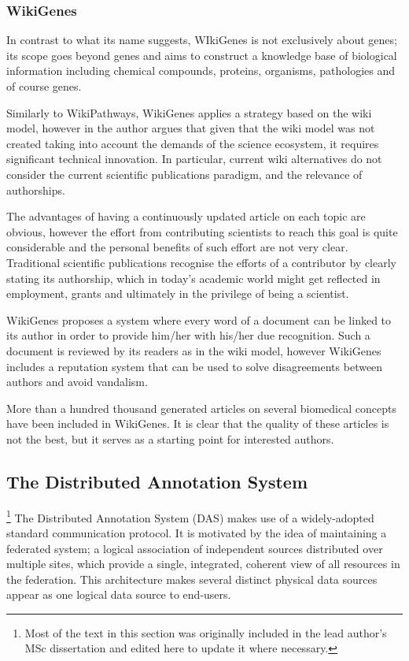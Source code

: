 \subsubsection{WikiGenes}
In contrast to what its name suggests, WIkiGenes is not exclusively about genes; its scope goes beyond genes and aims to construct a knowledge base of biological information including chemical compounds, proteins, organisms, pathologies and of course genes. 

Similarly to WikiPathways, WikiGenes applies a strategy based on the wiki model, however in \cite{HOF2008} the author argues that given that the wiki model was not created taking into account the demands of the science ecosystem, it requires significant technical innovation. In particular, current wiki alternatives do not consider the current scientific publications paradigm, and the relevance of authorships. 

The advantages of having a continuously updated article on each topic are obvious, however the effort from contributing scientists to reach this goal is quite considerable and the personal benefits of such effort are not very clear. Traditional scientific publications recognise the efforts of a contributor by clearly stating its authorship, which in today's academic world might get reflected in employment, grants and ultimately in the privilege of being a scientist.

WikiGenes proposes a system where every word of a document can be linked to its author in order to provide him/her with his/her due recognition. Such a document is reviewed by its readers as in the wiki model, however WikiGenes includes a reputation system that can be used to solve disagreements between authors and avoid vandalism.

More than a hundred thousand generated articles on several biomedical concepts have been included in WikiGenes. It is clear that the quality of these articles is not the best, but it serves as a starting point for interested authors.


\subsection{The Distributed Annotation System}
\footnote{Most of the text in this section was originally included in the lead author's MSc dissertation\cite{SAL2010} and edited here to update it where necessary.}
The Distributed Annotation System (DAS) \cite{DOW2001} makes use of a widely-adopted standard communication protocol. It is motivated by the idea of maintaining a federated system; a logical association of independent sources distributed over multiple sites, which provide a single, integrated, coherent view of all resources in the federation. This architecture makes several distinct physical data sources appear as one logical data source to end-users. 

